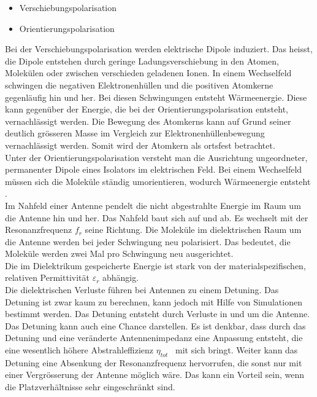 \begin{itemize}
\item Verschiebungspolarisation
\item Orientierungspolarisation
\end{itemize}
Bei der Verschiebungspolarisation werden elektrische Dipole induziert. Das heisst, die Dipole entstehen durch geringe Ladungsverschiebung in den Atomen, Molekülen oder zwischen verschieden geladenen Ionen. In einem Wechselfeld schwingen die negativen Elektronenhüllen und die positiven Atomkerne gegenläufig hin und her. Bei diesen Schwingungen entsteht Wärmeenergie. Diese kann gegenüber der Energie, die bei der Orientierungspolarisation entsteht, vernachlässigt werden. Die Bewegung des Atomkerns kann auf Grund seiner deutlich grösseren Masse im Vergleich zur Elektronenhüllenbewegung vernachlässigt werden. Somit wird der Atomkern als ortsfest betrachtet. \\
Unter der Orientierungspolarisation versteht man die Ausrichtung ungeordneter, permanenter Dipole eines Isolators im elektrischen Feld. Bei einem Wechselfeld müssen sich die Moleküle ständig umorientieren, wodurch Wärmeenergie entsteht \cite{DielektrikumPolarisation}.\\
Im Nahfeld einer Antenne pendelt die nicht abgestrahlte Energie im Raum um die Antenne hin und her. Das Nahfeld baut sich auf und ab. Es wechselt mit der Resonanzfrequenz $f_{r}$ seine Richtung. Die Moleküle im dielektrischen Raum um die Antenne werden bei jeder Schwingung neu polarisiert. Das bedeutet, die Moleküle werden zwei Mal pro Schwingung neu ausgerichtet.\\
Die im Dielektrikum gespeicherte Energie ist stark von der materialspezifischen, relativen Permittivität $\varepsilon_r $ abhängig.\\
Die dielektrischen Verluste führen bei Antennen zu einem Detuning. Das Detuning ist zwar kaum zu berechnen, kann jedoch mit Hilfe von Simulationen bestimmt werden. Das Detuning entsteht durch Verluste in und um die Antenne.\\ 
Das Detuning kann auch eine Chance darstellen. Es ist denkbar, dass durch das Detuning und eine veränderte Antennenimpedanz eine Anpassung entsteht, die eine wesentlich höhere Abstrahleffizienz $\eta_{tot}$ \ mit sich bringt. Weiter kann das Detuning eine Absenkung der Resonanzfrequenz hervorrufen, die sonst nur mit einer Vergrösserung der Antenne möglich wäre. Das kann ein Vorteil sein, wenn die Platzverhältnisse sehr eingeschränkt sind.\\
